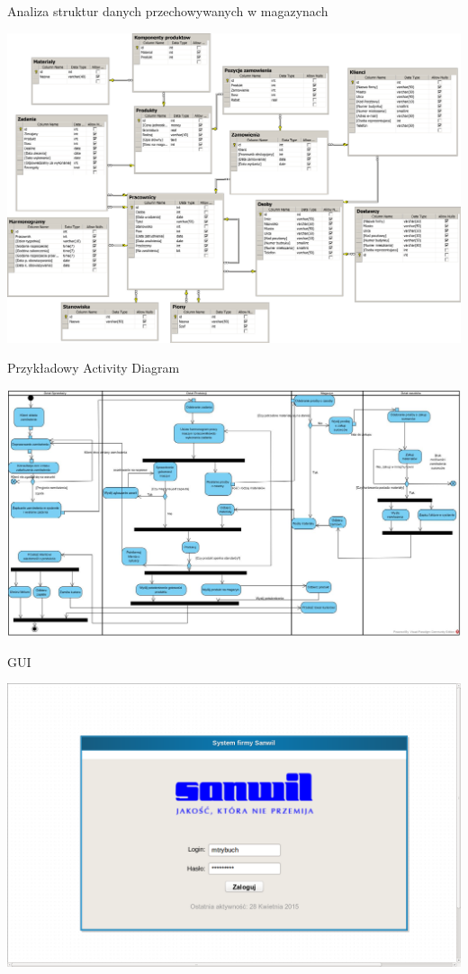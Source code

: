 \documentclass{beamer}
\begin{document}
\begin{frame}{Analiza struktur danych przechowywanych w magazynach}
\begin{block}
\centering
\includegraphics[scale=0.09]{diagram.png}
\end{block}
\end{frame}

\begin{frame}{Przykładowy Activity Diagram}
\begin{block}
\centering
\includegraphics[scale=0.19]{Sprzedaz.jpg}
\end{block}
\end{frame}

\begin{frame}{GUI}
\begin{block}
\centering
\includegraphics[scale=0.19]{logowanie.png}
\end{block}
\end{frame}
\end{document}
